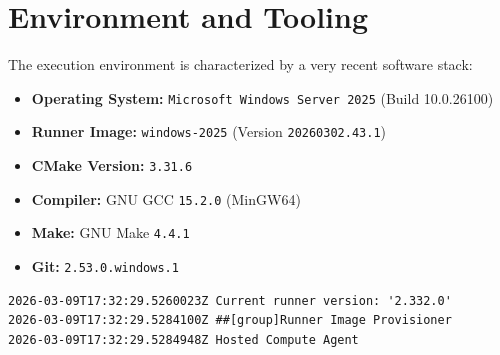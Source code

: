 \section{Environment and Tooling}
The execution environment is characterized by a very recent software stack:

\begin{itemize}
    \item \textbf{Operating System:} \texttt{Microsoft Windows Server 2025} (Build 10.0.26100)
    \item \textbf{Runner Image:} \texttt{windows-2025} (Version \texttt{20260302.43.1})
    \item \textbf{CMake Version:} \texttt{3.31.6}
    \item \textbf{Compiler:} GNU GCC \texttt{15.2.0} (MinGW64)
    \item \textbf{Make:} GNU Make \texttt{4.4.1}
    \item \textbf{Git:} \texttt{2.53.0.windows.1}
\end{itemize}

\begin{verbatim}
2026-03-09T17:32:29.5260023Z Current runner version: '2.332.0'
2026-03-09T17:32:29.5284100Z ##[group]Runner Image Provisioner
2026-03-09T17:32:29.5284948Z Hosted Compute Agent
\end{verbatim}


